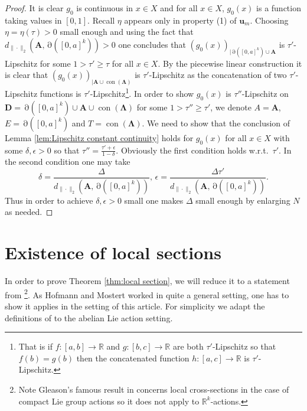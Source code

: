 \documentclass[11pt]{article}
\theoremstyle{plain}
\theoremstyle{definition}
\DeclareMathOperator{\Edge}{\partial}
\DeclareMathOperator{\con}{con}
\def\R{\mathbb{R}}
\def\AA{\mathbf A}
\def\DD{\mathbf D}
\def\LL{\mathbf \Lambda}
\numberwithin{figure}{section}
\begin{document}
\begin{proof}
It is clear $g_0$ is continuous in $x\in X$ and for all $x\in X$, $g_0(x)$ is a function taking values in $[0,1]$. Recall $\eta$ appears only in property (1) of $\mathbf u_m$.
Choosing $\eta=\eta(\tau)>0$  small enough and using the fact that $d_{\|\cdot\|_2}(\AA,\Edge([0,a]^k))>0$ one concludes  that $(g_0(x))_{|\Edge([0,a]^k)\cup \mathbf{A}}$ is $\tau'$-Lipschitz for some $1>\tau'\geq \tau$ for all $x\in X$.   By the piecewise linear construction it is clear that $(g_0(x))_{|\AA\cup\con(\LL)}$ is $\tau'$-Lipschitz as the concatenation of two $\tau'$-Lipschitz functions is $\tau'$-Lipschitz\footnote{That is if $f: [a, b] \to \mathbb{R}$ and $g: [b, c] \to \mathbb{R}$ are both $\tau'$-Lipschitz so that $f(b) = g(b)$ then the concatenated function $h: [a, c] \to \mathbb{R}$ is $\tau'$-Lipschitz.}.
In order to show $g_0(x)$ is $\tau''$-Lipschitz on $\DD=\Edge([0,a]^k)\cup \mathbf{A}\cup \con(\LL)$ for some $1>\tau''\geq \tau'$, we denote $A=\AA$, $E=\Edge([0,a]^k)$ and $T=\con(\LL)$. We  need to show that the conclusion of 
 Lemma \ref{lem:Lipschitz constant continuity} holds for $g_0(x)$ for all $x\in X$ with some $\delta, \epsilon>0$ so that $\tau''=\frac{\tau'+\epsilon}{1-\delta}$.  Obviously the first condition holds w.r.t.\ $\tau'$. In the second condition one may take
 $$\delta=\frac{\Delta}{d_{\|\cdot\|_2}(\AA,\Edge([0,a]^k))},\, \epsilon=\frac{\Delta \tau'}{d_{\|\cdot\|_2}(\AA,\Edge([0,a]^k))}.
 $$
Thus in order to achieve $\delta,\epsilon>0$ small one makes $\Delta$ small enough by enlarging $N$ as needed.  
 
\end{proof}




\appendix
\renewcommand{\appendixname}{Appendix~\Alph{section}}
\section{Existence of local sections}
\indent\indent In order to prove Theorem \ref{thm:local section}, we will reduce it to a statement from  \cite{HM66}\footnote{Note Gleason's famous result in  \cite{Gle50} concerns  local cross-sections in the case of compact Lie group actions so it does not apply to $\R^k$-actions.}. As  Hofmann and Mostert  worked in quite a general setting, one has to show it applies in the setting of this article. For simplicity we adapt the definitions  of \cite[Appendix II]{HM66} to the abelian Lie action setting.   
\end{document}
